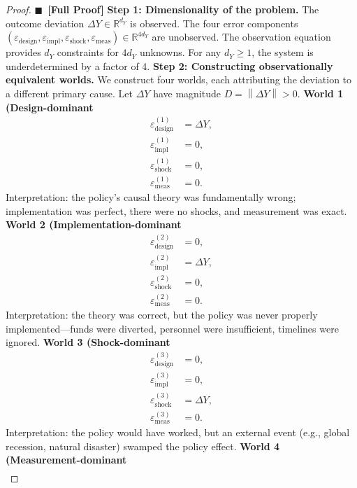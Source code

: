\documentclass[11pt,a4paper]{article}
\theoremstyle{definition}
\newcommand{\rigorFull}[0]{$\blacksquare$~\textbf{[Full Proof]}}
\newcommand{\R}{\mathbb{R}}
\newcommand{\norm}[1]{\left\lVert#1\right\rVert}
\begin{document}
\begin{proof}\rigorFull
\textbf{Step 1: Dimensionality of the problem.} The outcome deviation $\Delta Y \in \R^{d_Y}$ is observed. The four error components $(\varepsilon_{\mathrm{design}}, \varepsilon_{\mathrm{impl}}, \varepsilon_{\mathrm{shock}}, \varepsilon_{\mathrm{meas}}) \in \R^{4 d_Y}$ are unobserved. The observation equation provides $d_Y$ constraints for $4 d_Y$ unknowns. For any $d_Y \geq 1$, the system is underdetermined by a factor of 4.
\textbf{Step 2: Constructing observationally equivalent worlds.} We construct four worlds, each attributing the deviation to a different primary cause. Let $\Delta Y$ have magnitude $D = \norm{\Delta Y} > 0$.
\textbf{World 1 (Design-dominant}
\begin{align}
    \varepsilon_{\mathrm{design}}^{(1)} &= \Delta Y, \\
    \varepsilon_{\mathrm{impl}}^{(1)} &= 0, \\
    \varepsilon_{\mathrm{shock}}^{(1)} &= 0, \\
    \varepsilon_{\mathrm{meas}}^{(1)} &= 0.
\end{align}
Interpretation: the policy's causal theory was fundamentally wrong; implementation was perfect, there were no shocks, and measurement was exact.
\textbf{World 2 (Implementation-dominant}
\begin{align}
    \varepsilon_{\mathrm{design}}^{(2)} &= 0, \\
    \varepsilon_{\mathrm{impl}}^{(2)} &= \Delta Y, \\
    \varepsilon_{\mathrm{shock}}^{(2)} &= 0, \\
    \varepsilon_{\mathrm{meas}}^{(2)} &= 0.
\end{align}
Interpretation: the theory was correct, but the policy was never properly implemented---funds were diverted, personnel were insufficient, timelines were ignored.
\textbf{World 3 (Shock-dominant}
\begin{align}
    \varepsilon_{\mathrm{design}}^{(3)} &= 0, \\
    \varepsilon_{\mathrm{impl}}^{(3)} &= 0, \\
    \varepsilon_{\mathrm{shock}}^{(3)} &= \Delta Y, \\
    \varepsilon_{\mathrm{meas}}^{(3)} &= 0.
\end{align}
Interpretation: the policy would have worked, but an external event (e.g., global recession, natural disaster) swamped the policy effect.
\textbf{World 4 (Measurement-dominant}
\begin{align}

\end{align}
\end{proof}
\end{document}
